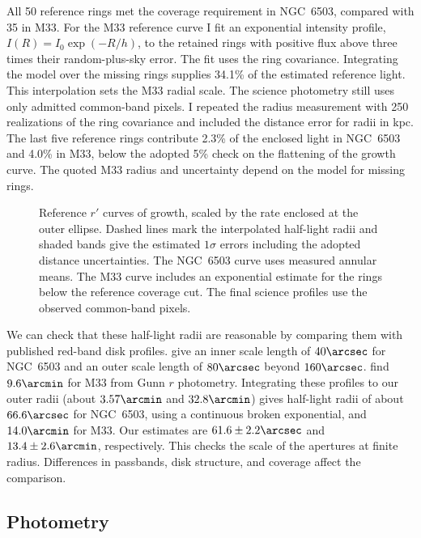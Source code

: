 All 50 reference rings met the coverage requirement in NGC~6503, compared with 35 in M33. For the M33 reference curve I fit an exponential intensity profile, $I(R)=I_0\exp(-R/h)$, to the retained rings with positive flux above three times their random-plus-sky error. The fit uses the ring covariance. Integrating the model over the missing rings supplies 34.1\% of the estimated reference light. This interpolation sets the M33 radial scale. The science photometry still uses only admitted common-band pixels. I repeated the radius measurement with 250 realizations of the ring covariance and included the distance error for radii in kpc. The last five reference rings contribute 2.3\% of the enclosed light in NGC~6503 and 4.0\% in M33, below the adopted 5\% check on the flattening of the growth curve. The quoted M33 radius and uncertainty depend on the model for missing rings.

\begin{figure}[t]
    \caption{Reference $r'$ curves of growth, scaled by the rate enclosed at the outer ellipse. Dashed lines mark the interpolated half-light radii and shaded bands give the estimated $1\sigma$ errors including the adopted distance uncertainties. The NGC~6503 curve uses measured annular means. The M33 curve includes an exponential estimate for the rings below the reference coverage cut. The final science profiles use the observed common-band pixels.}
    \label{fig:reference-growth}
\end{figure}

We can check that these half-light radii are reasonable by comparing them with published red-band disk profiles. \citet{methBottema} give an inner scale length of $40\arcsec$ for NGC~6503 and an outer scale length of $80\arcsec$ beyond $160\arcsec$. \citet{methKent} find $9.6\arcmin$ for M33 from Gunn $r$ photometry. Integrating these profiles to our outer radii (about $3.57\arcmin$ and $32.8\arcmin$) gives half-light radii of about $66.6\arcsec$ for NGC~6503, using a continuous broken exponential, and $14.0\arcmin$ for M33. Our estimates are $61.6\pm2.2\arcsec$ and $13.4\pm2.6\arcmin$, respectively. This checks the scale of the apertures at finite radius. Differences in passbands, disk structure, and coverage affect the comparison.

\subsection{Photometry}
\label{sec:photometry}

